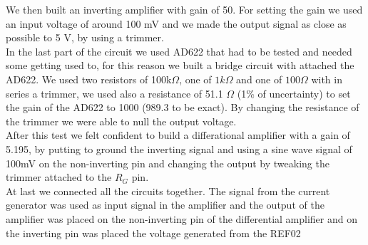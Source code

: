 We then built an inverting amplifier with gain of 50. For setting the gain we used an input voltage of around 100 mV and we made the output signal as close as possible to 5 V, by using a trimmer.\\

In the last part of the circuit we used AD622 that had to be tested and needed some getting used  to, for this reason we built a bridge circuit with attached the AD622. We used two resistors of 100k$\Omega$, one of $1k\Omega$ and one of $100 \Omega$ with in series a trimmer, we used also a resistance of 51.1 $\Omega$ (1\% of uncertainty) to set the gain of the AD622 to 1000 (989.3 to be exact). By changing the resistance of the trimmer we were able to null the output voltage.\\

After this test we felt confident to build a differational amplifier with a gain of 5.195, by putting to ground the inverting signal and using a sine wave signal of 100mV on the non-inverting pin and changing the output by tweaking the trimmer attached to the $R_G$ pin.\\

At last we connected all the circuits together. The signal from the current generator was used as input signal in the amplifier and the output of the amplifier was placed on the non-inverting pin of the differential amplifier and on the inverting pin was placed the voltage generated  from the REF02




